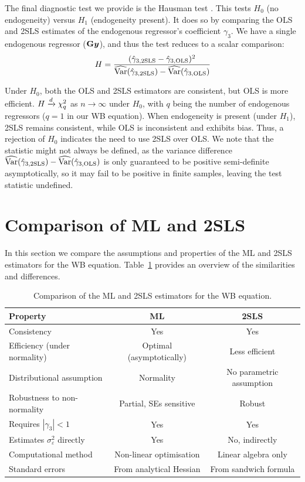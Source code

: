 The final diagnostic test we provide is the Hausman test \parencite{Hausman1978}. This tests $H_0$ (no endogeneity) versus $H_1$ (endogeneity present). It does so by comparing the OLS and 2SLS estimates of the endogenous regressor's coefficient $\gamma_3$. We have a single endogenous regressor ($\mathbf{G}\bm{y}$), and thus the test reduces to a scalar comparison:
\begin{equation}
    H = \frac{(\hat{\gamma}_{3,\text{2SLS}} - \hat{\gamma}_{3,\text{OLS}})^2}{\widehat{\operatorname{Var}}(\hat{\gamma}_{3,\text{2SLS}}) - \widehat{\operatorname{Var}}(\hat{\gamma}_{3,\text{OLS}})}
\end{equation}

Under $H_0$, both the OLS and 2SLS estimators are consistent, but OLS is more efficient. $H \xrightarrow{d} \chi^2_q$ as $n \to \infty$ under $H_0$, with $q$ being the number of endogenous regressors ($q = 1$ in our WB equation). When endogeneity is present (under $H_1$), 2SLS remains consistent, while OLS is inconsistent and exhibits bias. Thus, a rejection of $H_0$ indicates the need to use 2SLS over OLS\@. We note that the statistic might not always be defined, as the variance difference $\widehat{\operatorname{Var}}(\hat{\gamma}_{3,\text{2SLS}}) - \widehat{\operatorname{Var}}(\hat{\gamma}_{3,\text{OLS}})$ is only guaranteed to be positive semi-definite asymptotically, so it may fail to be positive in finite samples, leaving the test statistic undefined.

\section{Comparison of ML and 2SLS}
\label{sec:est:comparison}
In this section we compare the assumptions and properties of the ML and 2SLS estimators for the WB equation. Table~\ref{tab:ml_vs_2sls} provides an overview of the similarities and differences.

\begin{table}[htbp]
\centering
\caption[Comparison of the ML and 2SLS estimators for the WB equation]{Comparison of the ML and 2SLS estimators for the WB equation.}
\label{tab:ml_vs_2sls}
\small
\begin{tabular}{lcc}
\toprule
Property & ML & 2SLS \\
\midrule
Consistency & Yes & Yes \\
Efficiency (under normality) & Optimal (asymptotically) & Less efficient \\
Distributional assumption & Normality & No parametric assumption \\
Robustness to non-normality & Partial, SEs sensitive & Robust \\
Requires $|\gamma_3| < 1$ & Yes & Yes \\
Estimates $\sigma_\varepsilon^2$ directly & Yes & No, indirectly \\
Computational method & Non-linear optimisation & Linear algebra only \\
Standard errors & From analytical Hessian & From sandwich formula \\
\bottomrule
\end{tabular}
\end{table}

